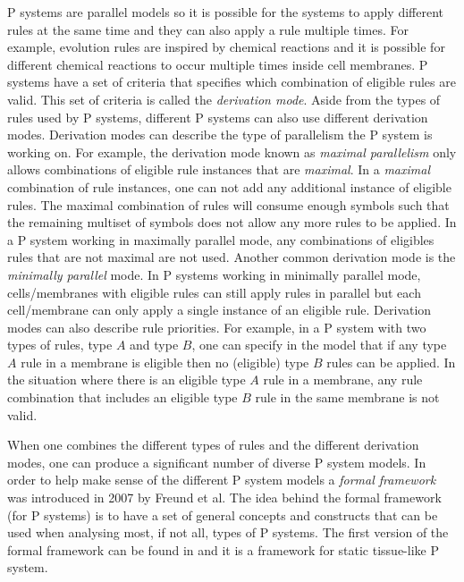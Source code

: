 \documentclass[a4paper]{article}
\theoremstyle{definition}
\begin{document}
P systems are parallel models so it is possible for the systems to apply different rules at
the same time and they can also apply a rule multiple times. For example, evolution rules are 
inspired by chemical reactions and it is possible for different chemical reactions to occur multiple
times inside cell membranes. P systems have a set of criteria that specifies which combination of
eligible rules are valid. This set of criteria is called the \emph{derivation mode}. Aside from the
types of rules used by P systems, different P systems can also use different derivation modes.
Derivation modes can describe the type of parallelism the P system is working on. For example, the
derivation mode known as \emph{maximal parallelism} only allows combinations of eligible rule 
instances that are \emph{maximal}. In a \emph{maximal} combination of rule instances, one can not
add any additional instance of eligible rules. The maximal combination of rules will consume 
enough  symbols such that the remaining multiset of symbols does not allow any more rules to be 
applied. In a P system working in maximally parallel mode, any combinations of eligibles rules that 
are not maximal are not used. Another common derivation mode is the \emph{minimally parallel} mode. 
In P systems working in minimally parallel mode, cells/membranes with eligible rules can still apply
rules in parallel but each cell/membrane can only apply a single instance of an eligible rule. 
Derivation modes can also describe rule priorities. For example, in a P system with two types of 
rules, type $A$ and type $B$, one can specify in the model that if any type $A$ rule in a membrane 
is eligible then no (eligible) type $B$ rules can be applied. In the situation where there is an 
eligible type $A$ rule in a membrane, any rule combination that includes an eligible type $B$ rule 
in the same membrane is not valid.

When one combines the different types of rules and the different derivation modes, one can produce
a significant number of diverse P system models. In order to help make sense of the different P 
system models a \emph{formal framework} was introduced in 2007 by Freund et al. The idea behind the 
formal framework (for P systems) is to have a set of general concepts and constructs that can be 
used when analysing most, if not all, types of P systems. The first version of the formal framework
can be found in \cite{freund-2007-ff-1} and it is a framework for static tissue-like P system.
\end{document}
